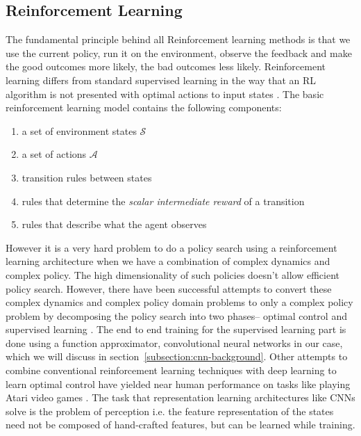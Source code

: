 \subsection{Reinforcement Learning}
\label{section:RL}
The fundamental principle behind all Reinforcement learning methods is that we 
use the current policy, run it on the environment, observe the feedback and 
make the good outcomes more likely, the bad outcomes less likely. Reinforcement 
learning differs from standard supervised learning in the way that an RL 
algorithm is not presented with optimal actions to input states 
\cite{sutton1998reinforcement}. The basic reinforcement learning model contains 
the following components:
\begin{enumerate}
 \item a set of environment states $\mathcal{S}$
 \item a set of actions $\mathcal{A}$
 \item transition rules between states
 \item rules that determine the \textit{scalar intermediate reward} of a 
transition
\item rules that describe what the agent observes
\end{enumerate}
However it is a very hard problem to do a policy search using a reinforcement 
learning architecture when we have a combination of complex dynamics and 
complex policy. The high dimensionality of such policies doesn't allow 
efficient policy search. However, there have been successful attempts to 
convert these complex dynamics and complex policy domain problems to only a 
complex policy problem by decomposing the policy search into two phases-- 
optimal control and supervised learning \cite{levine2015end}. The end to end 
training for the supervised learning part is done using a function 
approximator, convolutional neural networks in our case, which we will 
discuss in section~\ref{subsection:cnn-background}. 
Other attempts to combine conventional reinforcement learning techniques with 
deep learning to learn optimal control have yielded near human performance on 
tasks like playing Atari video games \cite{deepmind_nips}. The task that 
representation learning architectures like CNNs solve is the problem of 
perception i.e. the feature representation of the states need not be 
composed of hand-crafted features, but can be learned while training.

